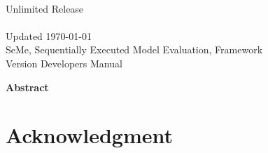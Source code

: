 \documentclass[letterpaper]{book}
\begin{document}
\begin{titlepage}
\setcounter{page}{3}
\begin{center}
{\large \SeMeSANDDev}\\
{\large Unlimited Release}\\
{\large \SeMeSANDDate}\\
{\large Updated \today}\\

\vspace*{1.5cm}
{\LARGE SeMe, Sequentially Executed Model Evaluation, Framework}\\
\vspace*{1cm}
{\LARGE Version \SeMeVersion\space Developers Manual}\\
\vspace*{1cm}

\SeMeAuthorFormatted

\pagebreak

{\Large \bf Abstract}
\end{center}

\SeMeAbstractShared
\SeMeAbstractDev

\end{titlepage}
\section*{Acknowledgment}


\cleardoublepage
\tableofcontents
\cleardoublepage
%   
\end{document}
